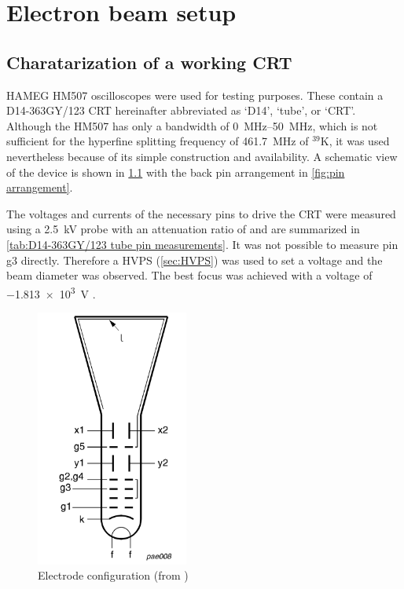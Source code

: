 \chapter{Electron beam setup}\label{ch:Electron beam setup}

\section{Charatarization of a working CRT}\label{sec:Charatarization of a working CRT}

HAMEG HM507 oscilloscopes were used for testing purposes. These contain a D14-363GY/123\autocite{D14363GY123-manual} CRT hereinafter abbreviated as `D14', `tube', or `CRT'. Although the HM507 has only a bandwidth of \SIrange{0}{50}{\mega\hertz}, which is not sufficient for the hyperfine splitting frequency of \SI{461.7}{\mega\hertz} of $^{39}\mathrm{K}$, it was used nevertheless because of its simple construction and availability. A schematic view of the device is shown in \cref{fig:electrode configuration} with the back pin arrangement in \cref{fig:pin arrangement}.

The voltages and currents of the necessary pins to drive the CRT were measured using a \SI{2.5}{\kilo\volt} probe  with an attenuation ratio of  and are summarized in \cref{tab:D14-363GY/123 tube pin measurements}. It was not possible to measure pin g3 directly. Therefore a HVPS (\cref{sec:HVPS}) was used to set a voltage and the beam diameter was observed. The best focus was achieved with a voltage of \SI{-1.813e3}{\volt} .

\begin{figure}[H]
	\centering
	\includegraphics[width=5cm]{./Chapters/e-beam-setup/electrode configuration}
	\caption{Electrode configuration (from \autocite{D14363GY123-manual})}
	\label{fig:electrode configuration}
\end{figure}

